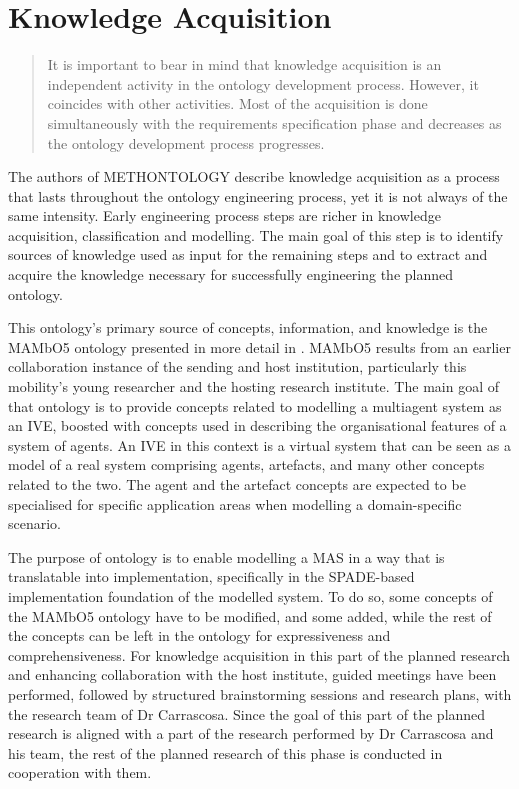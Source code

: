 \chapter{Knowledge Acquisition}\label{ch: Knowledge Acquisition}


\blockquote[{{\cite[p. 37]{fernandez-lopez1997METHONTOLOGYOntologicalArt}}}]{It is important to bear in mind that knowledge acquisition is an independent activity in the ontology development process. However, it coincides with other activities. \textelp{} Most of the acquisition is done simultaneously with the requirements specification phase and decreases as the ontology development process progresses.}

The authors of METHONTOLOGY describe knowledge acquisition as a process that lasts throughout the ontology engineering process, yet it is not always of the same intensity. Early engineering process steps are richer in knowledge acquisition, classification and modelling. The main goal of this step is to identify sources of knowledge used as input for the remaining steps and to extract and acquire the knowledge necessary for successfully engineering the planned ontology.

This ontology's primary source of concepts, information, and knowledge is the MAMbO5 ontology presented in more detail in \cite{okresaduric2019MAMbO5NewOntology}. MAMbO5 results from an earlier collaboration instance of the sending and host institution, particularly this mobility's young researcher and the hosting research institute. The main goal of that ontology is to provide concepts related to modelling a multiagent system as an \ac{IVE}, boosted with concepts used in describing the organisational features of a system of agents. An \ac{IVE} in this context is a virtual system that can be seen as a model of a real system comprising agents, artefacts, and many other concepts related to the two. The agent and the artefact concepts are expected to be specialised for specific application areas when modelling a domain-specific scenario.

The purpose of \magoontologyname ontology is to enable modelling a \ac{MAS} in a way that is translatable into implementation, specifically in the SPADE-based implementation foundation of the modelled system. To do so, some concepts of the MAMbO5 ontology have to be modified, and some added, while the rest of the concepts can be left in the ontology for expressiveness and comprehensiveness. For knowledge acquisition in this part of the planned research and enhancing collaboration with the host institute, guided meetings have been performed, followed by structured brainstorming sessions and research plans, with the research team of Dr Carrascosa. Since the goal of this part of the planned research is aligned with a part of the research performed by Dr Carrascosa and his team, the rest of the planned research of this phase is conducted in cooperation with them.

